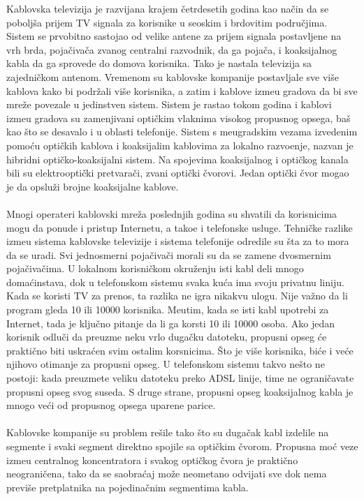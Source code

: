 \documentclass{article} %
\begin{document}
Kablovska televizija je razvijana krajem \v cetrdesetih godina kao na\v cin da se pobolj\v sa prijem TV signala za korisnike u seoskim i brdovitim podru\v cjima. Sistem se prvobitno sastojao od velike antene za prijem signala postavljene na vrh brda, poja\v civa\v ca zvanog centralni razvodnik, da ga poja\v ca, i koaksijalnog kabla da ga sprovede do domova korisnika. Tako je nastala televizija sa zajedni\v ckom antenom. Vremenom su kablovske kompanije postavljale sve vi\v se kablova kako bi podr\v zali vi\v se korisnika, a zatim i kablove izme\dj u gradova da bi sve mre\v ze povezale u jedinstven sistem. Sistem je rastao tokom godina i kablovi izme\dj u gradova su zamenjivani opti\v ckim vlaknima visokog propusnog opsega, ba\v s kao \v sto se desavalo i u oblasti telefonije. Sistem s me\dj ugradskim vezama izvedenim pomo\' cu opti\v ckih kablova i koaksijalim kablovima za lokalno razvo\dj enje, nazvan je hibridni opti\v cko-koaksijalni sistem. Na spojevima koaksijalnog i opti\v ckog kanala bili su elektroopti\v cki pretvara\v ci, zvani opti\v cki \v cvorovi. Jedan opti\v cki \v cvor mogao je da opslu\v zi brojne koaksijalne kablove.
\\
\\ Mnogi operateri kablovski mre\v za poslednjih godina su shvatili da korisnicima mogu da ponude i pristup Internetu, a tako\dj e i telefonske usluge. Tehni\v cke razlike izme\dj u sistema kablovske televizije i sistema telefonije odredile su \v sta za to mora da se uradi. Svi jednosmerni poja\v civa\v ci morali su da se zamene dvosmernim poja\v civa\v cima. U lokalnom korisni\v ckom okru\v zenju isti kabl deli mnogo doma\' cinstava, dok u telefonskom sistemu svaka ku\' ca ima svoju privatnu liniju. Kada se koristi TV za prenos, ta razlika ne igra nikakvu ulogu. Nije va\v zno da li program gleda 10 ili 10000 korisnika. Me\dj utim, kada se isti kabl upotrebi za Internet, tada je klju\v cno pitanje da li ga korsti 10 ili 10000 osoba. Ako jedan korisnik odlu\v ci da preuzme neku vrlo duga\v cku datoteku, propusni opseg \' ce prakti\v cno biti uskra\' cen svim ostalim korsnicima. \v Sto je vi\v se korisnika, bi\' ce i ve\' ce njihovo otimanje za propusni opseg. U telefonskom sistemu takvo ne\v sto ne postoji: kada preuzmete veliku datoteku preko ADSL linije, time ne ograni\v cavate propusni opseg svog suseda. S druge strane, propusni opseg koaksijalnog kabla je mnogo ve\' ci od propusnog opsega uparene parice.
\\
\\ Kablovske kompanije su problem re\v sile tako \v sto su duga\v cak kabl izdelile na segmente i svaki segment direktno spojile sa opti\v ckim \v cvorom. Propusna mo\' c veze izme\dj u centralnog koncentratora i svakog opti\v ckog \v cvora je prakti\v cno neograni\v cena, tako da se saobra\' caj mo\v ze neometano odvijati sve dok nema previ\v se pretplatnika na pojedina\v cnim segmentima kabla. 
\end{document}
